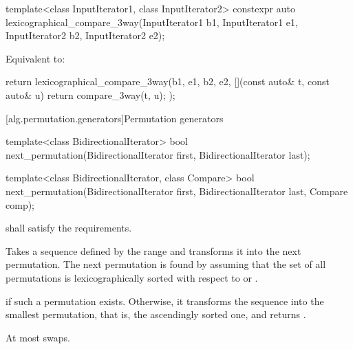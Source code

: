 %
\begin{itemdecl}
template<class InputIterator1, class InputIterator2>
  constexpr auto
    lexicographical_compare_3way(InputIterator1 b1, InputIterator1 e1,
                                 InputIterator2 b2, InputIterator2 e2);
\end{itemdecl}

\begin{itemdescr}
\pnum
\effects
Equivalent to:
\begin{codeblock}
return lexicographical_compare_3way(b1, e1, b2, e2,
                                    [](const auto& t, const auto& u) {
                                      return compare_3way(t, u);
                                    });
\end{codeblock}
\end{itemdescr}

[alg.permutation.generators]{Permutation generators}

%
\begin{itemdecl}
template<class BidirectionalIterator>
  bool next_permutation(BidirectionalIterator first,
                        BidirectionalIterator last);

template<class BidirectionalIterator, class Compare>
  bool next_permutation(BidirectionalIterator first,
                        BidirectionalIterator last, Compare comp);
\end{itemdecl}

\begin{itemdescr}
\pnum
\requires
{} shall satisfy the
 requirements.

\pnum
\effects
Takes a sequence defined by the range
and transforms it into the next permutation.
The next permutation is found by assuming that the set of all permutations is
lexicographically sorted with respect to
or .

\pnum
\returns
{}
if such a permutation exists.
Otherwise, it transforms the sequence into the smallest permutation,
that is, the ascendingly sorted one, and returns
.

\pnum
\complexity
At most
swaps.
\end{itemdescr}

